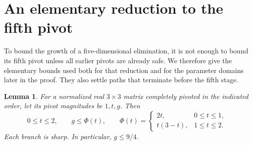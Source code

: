 \documentclass[11pt,reqno]{amsart}
\newtheorem{lemma}[theorem]{Lemma}
\theoremstyle{definition}
\theoremstyle{remark}
\begin{document}
\section{An elementary reduction to the fifth pivot}\label{sec:scalar}

To bound the growth of a five-dimensional elimination, it is not enough
to bound its fifth pivot unless all earlier pivots are already safe.
We therefore give the elementary bounds used both for that reduction
and for the parameter domains later in the proof. They also settle
paths that terminate before the fifth stage.

\begin{lemma}\label{lem:Phi}
For a normalized real \(3\times3\) matrix completely pivoted in
the indicated order, let its pivot magnitudes be \(1,t,g\). Then
\[
0\le t\le2,\qquad g\le\Phi(t),\qquad
\Phi(t)=
\begin{cases}
2t,&0\le t\le1,\\
t(3-t),&1\le t\le2.
\end{cases}
\]
Each branch is sharp. In particular, \(g\le9/4\).
\end{lemma}
\end{document}
